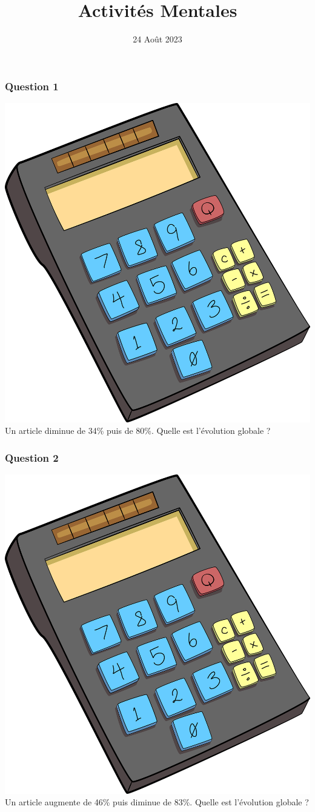 \documentclass[15pt, mathserif]{beamer}
\title{Activités Mentales}
\date{24 Août 2023}
\begin{document}
\begin{frame}
    \titlepage
\end{frame}

\begin{frame} 
	\frametitle{Question 1}
\includegraphics[scale=0.01]{calculatrice} Un article diminue de 34\% puis de 80\%. Quelle est l'évolution globale ?\end{frame}


\begin{frame} 
	\frametitle{Question 2}
\includegraphics[scale=0.01]{calculatrice} Un article augmente de 46\% puis diminue de 83\%. Quelle est l'évolution globale ?\end{frame}
\end{document}
